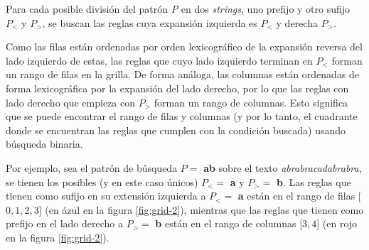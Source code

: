 Para cada posible división del patrón \textit{P} en dos \textit{strings}, uno prefijo y otro sufijo $P_<$ y $P_>$, se buscan las reglas cuya expansión izquierda es $P_<$ y derecha $P_>$.

Como las filas están ordenadas por orden lexicográfico de la expansión reversa del lado izquierdo de estas, las reglas que cuyo lado izquierdo terminan en $P_<$ forman un rango de filas en la grilla. De forma análoga, las columnas están ordenadas de forma lexicográfica por la expansión del lado derecho, por lo que las reglas con lado derecho que empieza con $P_>$ forman un rango de columnas. Esto significa que se puede encontrar el rango de filas y columnas (y por lo tanto, el cuadrante donde se encuentran las reglas que cumplen con la condición buscada) usando búsqueda binaria.

Por ejemplo, sea el patrón de búsqueda $P =$ \textbf{ab} sobre el texto \textit{abrabracadabrabra}, se tienen los posibles (y en este caso únicos) $P_< =$ \textbf{a} y $P_> =$ \textbf{b}. Las reglas que tienen como sufijo en su extensión izquierda a $P_< =$ \textbf{a} están en el rango de filas [$0,1,2,3$] (en ázul en la figura \ref{fig:grid-2}), mientras que las reglas que tienen como prefijo en el lado derecho a $P_> =$ \textbf{b} están en el rango de columnas [$3, 4$] (en rojo en la figura \ref{fig:grid-2}).

